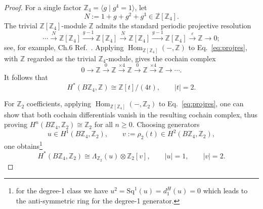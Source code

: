 \documentclass[aps,prx,reprint,superscriptaddress,twocolumn,amsmath,amssymb,amsfonts, nofootinbib]{revtex4-2}
\newcommand{\Z}{\mathbb{Z}}
\theoremstyle{apsstyle}
\begin{document}
\begin{proof}
For a single factor $\Z_{4}=\langle g\mid g^4=1\rangle$, let
\begin{equation*}
N:=1+g+g^2+g^3\in\mathbb Z[\Z_{4}].
\end{equation*}
The trivial $\mathbb Z[\Z_{4}]$-module $\mathbb Z$ admits the standard
periodic projective resolution
\begin{equation}
\cdots \xrightarrow{N} \mathbb Z[\Z_{4}]
\xrightarrow{g-1} \mathbb Z[\Z_{4}] \xrightarrow{N}
\mathbb Z[\Z_{4}] \xrightarrow{g-1} \mathbb Z[\Z_{4}]
\xrightarrow{\varepsilon} \mathbb Z
\longrightarrow0;
\label{eq:projres}
\end{equation}
see, for example, Ch.6 Ref.~\cite{Weibel1994}. Applying
$\operatorname{Hom}_{\mathbb Z[\Z_{4}]}(-,\mathbb Z)$ to Eq.~\ref{eq:projres}, with $\mathbb Z$ regarded as the trivial $\Z_{4}$-module, gives the cochain complex
\begin{equation*}
0
\longrightarrow
\mathbb Z
\xrightarrow{0}
\mathbb Z
\xrightarrow{\times4}
\mathbb Z
\xrightarrow{0}
\mathbb Z
\xrightarrow{\times4}
\mathbb Z
\longrightarrow\cdots.
\end{equation*}
It follows that
\begin{equation*}
H^*(B\Z_{4},\mathbb Z)
\cong
\mathbb Z[t]/(4t),
\qquad
|t|=2.
\end{equation*}

\noindent For $\mathbb Z_2$ coefficients, applying $\operatorname{Hom}_{\mathbb Z[\Z_{4}]}(-,\mathbb Z_2)$ to Eq.~\ref{eq:projres}, one can show that both cochain differentials vanish in the resulting cochain complex, thus proving $H^{n}(B\Z_{4}, \Z_{2})\cong \Z_{2}$ for all $n\geq 0$. Choosing generators
\begin{equation*}
u\in H^1(B\Z_{4},\mathbb Z_2),
\qquad
v:=\rho_2(t)\in H^2(B\Z_{4},\mathbb Z_2),
\end{equation*}
one obtains\footnote{for the degree-1 class we have $u^{2}=\mathrm{Sq}^{1}(u)= d_{1}^{H}(u)=0$ which leads to the anti-symmetric ring for the degree-1 generator.}
\begin{equation*}
H^*(B\Z_{4},\mathbb Z_2)
\cong \Lambda_{\mathbb Z_2}(u)\otimes\mathbb Z_2[v],
\qquad |u|=1, \qquad |v|=2.
\end{equation*}


\end{proof}
\end{document}
